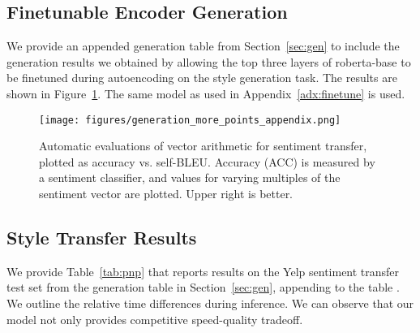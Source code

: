 \subsection{Finetunable Encoder Generation}
We provide an appended generation table from Section~\ref{sec:gen} to include the generation results we obtained by allowing the top three layers of roberta-base to be finetuned during autoencoding on the style generation task. The results are shown in Figure~\ref{fig:gen_plus_finetune}. The same model as used in Appendix~\ref{adx:finetune} is used.
\begin{figure}[ht]
\centering
\hspace{-2mm}\texttt{[image: figures/generation\_more\_points\_appendix.png]} 
\caption{\label{fig:gen_plus_finetune} %
Automatic evaluations of vector arithmetic for sentiment transfer, plotted as accuracy vs. self-BLEU. Accuracy (ACC) is measured by a sentiment classifier, and values for varying multiples of the sentiment vector are plotted. Upper right is better.
}
\end{figure}

\subsection{Style Transfer Results}
We provide Table~\ref{tab:pnp} that reports results on the Yelp sentiment transfer test set from the generation table in Section~\ref{sec:gen}, appending to the table \citep{mai2020plug}. We outline the relative time differences during inference. We can observe that our model not only provides competitive speed-quality tradeoff.

